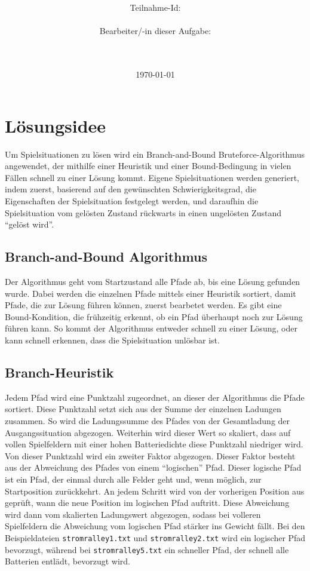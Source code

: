 \documentclass[a4paper,10pt,ngerman]{scrartcl}
\title{\textbf{\Huge\Aufgabe}}
\author{\LARGE Teilnahme-Id: \LARGE \TeilnahmeId \\\\
	    \LARGE Bearbeiter/-in dieser Aufgabe: \\ 
	    \LARGE \Namen\\\\}
\date{\LARGE\today}
\begin{document}
\maketitle
\newpage

\tableofcontents
\newpage

\section{Lösungsidee}
Um Spielsituationen zu lösen wird ein Branch-and-Bound Bruteforce-Algorithmus angewendet,
der mithilfe einer Heuristik und einer Bound-Bedingung in vielen Fällen schnell zu einer Lösung kommt.
Eigene Spielsituationen werden generiert, indem zuerst, basierend auf den gewünschten Schwierigkeitsgrad,
die Eigenschaften der Spielsituation festgelegt werden, und daraufhin die Spielsituation vom gelösten Zustand rückwarts
in einen ungelösten Zustand ``gelöst wird''.

\subsection{Branch-and-Bound Algorithmus}
Der Algorithmus geht vom Startzustand alle Pfade ab, bis eine Lösung gefunden wurde.
Dabei werden die einzelnen Pfade mittels einer Heuristik sortiert, damit Pfade, die zur Lösung führen können, zuerst bearbetet werden.
Es gibt eine Bound-Kondition, die frühzeitig erkennt, ob ein Pfad überhaupt noch zur Lösung führen kann.
So kommt der Algorithmus entweder schnell zu einer Lösung, oder kann schnell erkennen, dass die Spielsituation unlösbar ist.

\subsection{Branch-Heuristik}
Jedem Pfad wird eine Punktzahl zugeordnet, an dieser der Algorithmus die Pfade sortiert.
Diese Punktzahl setzt sich aus der Summe der einzelnen Ladungen zusammen.
So wird die Ladungssumme des Pfades von der Gesamtladung der Ausgangssituation abgezogen.
Weiterhin wird dieser Wert so skaliert, dass auf vollen Spielfeldern mit einer hohen Batteriedichte diese Punktzahl niedriger wird.
Von dieser Punktzahl wird ein zweiter Faktor abgezogen. Dieser Faktor besteht aus der Abweichung des Pfades von einem ``logischen'' Pfad.
Dieser logische Pfad ist ein Pfad, der einmal durch alle Felder geht und, wenn möglich, zur Startposition zurückkehrt.
An jedem Schritt wird von der vorherigen Position aus geprüft, wann die neue Position im logischen Pfad auftritt.
Diese Abweichung wird dann vom skalierten Ladungswert abgezogen, sodass bei volleren Spielfeldern die Abweichung vom logischen Pfad stärker ins Gewicht fällt.
Bei den Beispieldateien \texttt{stromralley1.txt} und \texttt{stromralley2.txt} wird ein logischer Pfad bevorzugt,
während bei \texttt{stromralley5.txt} ein schneller Pfad, der schnell alle Batterien entlädt, bevorzugt wird.
\end{document}
